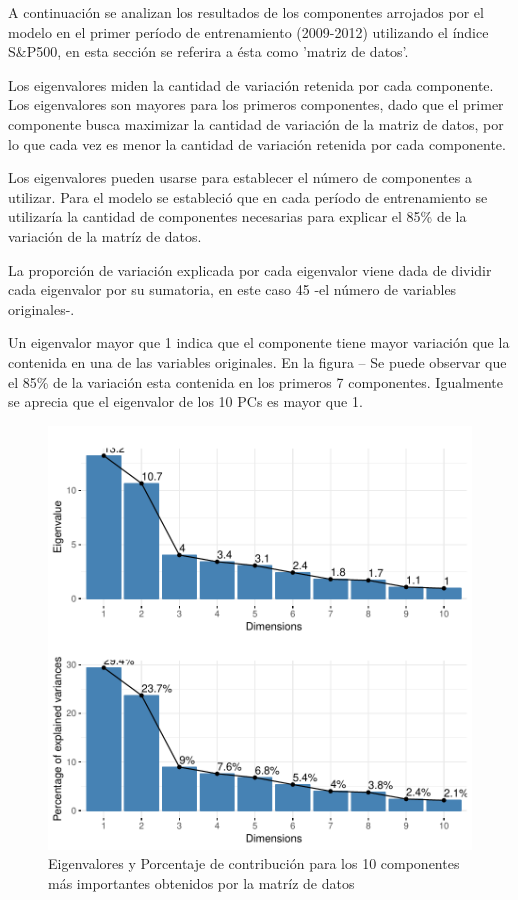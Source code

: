 \documentclass[a4paper,12pt]{Latex/Classes/PhDthesisPSnPDF}
\begin{document}
A continuación se analizan los resultados de los componentes arrojados por el modelo en el primer período de entrenamiento (2009-2012) utilizando el índice S\&P500, en esta sección se referira a ésta como 'matriz de datos'.


Los eigenvalores miden la cantidad de variación retenida por cada componente. Los eigenvalores son mayores para los primeros componentes, dado que el primer componente busca maximizar la cantidad de variación de la matriz de datos, por lo que cada vez es menor la cantidad de variación retenida por cada componente.

Los eigenvalores pueden usarse para establecer el número de componentes a utilizar. Para el modelo se estableció que en cada período de entrenamiento se utilizaría la cantidad de componentes necesarias para explicar el 85\% de la variación de la matríz de datos.

La proporción de variación explicada por cada eigenvalor viene dada de dividir cada eigenvalor por su sumatoria, en este caso 45 -el número de variables originales-.

Un eigenvalor mayor que 1 indica que el componente tiene mayor variación que la contenida en una de las variables originales. En la figura -- Se puede observar que el 85\% de la variación esta contenida en los primeros 7 componentes. Igualmente se aprecia que el eigenvalor de los 10 PCs es mayor que 1. 

\begin{figure}[H]
\centering
\includegraphics{main-008}
\caption{Eigenvalores y Porcentaje de contribución para los 10 componentes más importantes obtenidos por la matríz de datos}
\end{figure}
\end{document}
